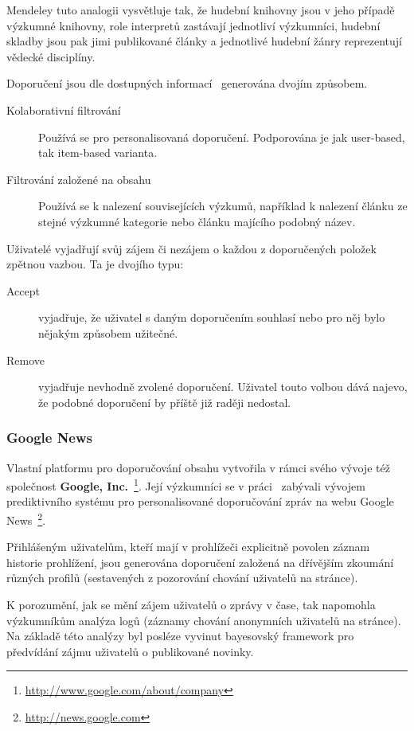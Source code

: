 \documentclass[thesis=M,czech]{FITthesis}[2014/05/07]
\begin{document}
Mendeley tuto analogii vysvětluje tak, že hudební knihovny jsou v jeho případě výzkumné knihovny, role interpretů zastávají jednotliví výzkumníci, hudební skladby jsou pak jimi publikované články a jednotlivé hudební žánry reprezentují vědecké disciplíny.  

Doporučení jsou dle dostupných informací~\cite{mendeleylastfm} generována dvojím způsobem. 

\begin{description}
	\item[Kolaborativní filtrování] Používá se pro personalisovaná doporučení. Podporována je jak user-based, tak item-based varianta.
	\item[Filtrování založené na obsahu] Používá se k nalezení souvisejících výzkumů, například k nalezení článku ze stejné výzkumné kategorie nebo článku majícího podobný název. 
\end{description}

Uživatelé vyjadřují svůj zájem či nezájem o každou z doporučených položek zpětnou vazbou. Ta je dvojího typu:

\begin{description}
	\item[Accept] vyjadřuje, že uživatel s daným doporučením souhlasí nebo pro něj bylo nějakým způsobem užitečné.
	\item[Remove] vyjadřuje nevhodně zvolené doporučení. Uživatel touto volbou dává najevo, že podobné doporučení by příště již raději nedostal.
\end{description}

\subsubsection{Google News}	

Vlastní platformu pro doporučování obsahu vytvořila v rámci svého vývoje též společnost \textbf{Google, Inc.}~\footnote{\url{http://www.google.com/about/company}}. Její výzkumníci se v práci~\cite{googlenews} zabývali vývojem prediktivního systému pro personalisované doporučování zpráv na webu Google News~\footnote{\url{http://news.google.com}}.

Přihlášeným uživatelům, kteří mají v prohlížeči explicitně povolen záznam historie prohlížení, jsou generována doporučení založená na dřívějším zkoumání různých profilů (sestavených z pozorování chování uživatelů na stránce).  

K porozumění, jak se mění zájem uživatelů o zprávy v čase, tak napomohla výzkumníkům analýza logů (záznamy chování anonymních uživatelů na stránce). Na základě této analýzy byl posléze vyvinut bayesovský framework pro předvídání zájmu uživatelů o publikované novinky.
\end{document}
